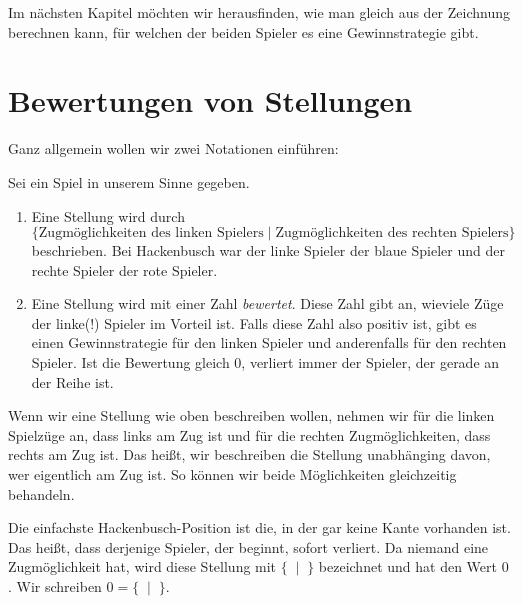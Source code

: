 \documentclass{zirkelbrief1516}
\begin{document}
Im n\"achsten Kapitel m\"ochten wir herausfinden, wie man gleich aus der Zeichnung berechnen kann, f\"ur welchen der beiden Spieler es eine Gewinnstrategie gibt.

\section*{Bewertungen von Stellungen}

Ganz allgemein wollen wir zwei Notationen einführen:

\begin{definition}
  Sei ein Spiel in unserem Sinne gegeben.
  \begin{enumerate}
  \item Eine Stellung wird durch
    \begin{equation*}
      \{\text{Zugmöglichkeiten des linken Spielers}\mid\text{Zugmöglichkeiten des rechten Spielers}\}
    \end{equation*}
    beschrieben. Bei Hackenbusch war der linke Spieler der blaue Spieler und der rechte Spieler der rote Spieler.
  \item Eine Stellung wird mit einer Zahl \emph{bewertet}. Diese Zahl gibt an, wieviele Züge der linke(!) Spieler im Vorteil ist. Falls diese Zahl also positiv ist, gibt es einen Gewinnstrategie f\"ur den linken Spieler und anderenfalls f\"ur den rechten Spieler. Ist die Bewertung gleich 0, verliert immer der Spieler, der gerade an der Reihe ist.
  \end{enumerate}
\end{definition}

  Wenn wir eine Stellung wie oben beschreiben wollen, nehmen wir für die linken Spielzüge an, dass links am Zug ist und für die rechten Zugmöglichkeiten, dass rechts am Zug ist. Das heißt, wir beschreiben die Stellung unabhänging davon, wer eigentlich am Zug ist. So k\"onnen wir beide M\"oglichkeiten gleichzeitig behandeln.

\begin{beispiel}
Die einfachste Hackenbusch-Position ist die, in der gar keine Kante vorhanden ist. Das heißt, dass derjenige Spieler, der beginnt, sofort verliert. Da niemand eine Zugmöglichkeit hat, wird diese Stellung mit $\{\;\mid\;\}$ bezeichnet und hat den Wert $0$. Wir schreiben $0=\{\;\mid\;\}$.
\end{beispiel}
\end{document}
